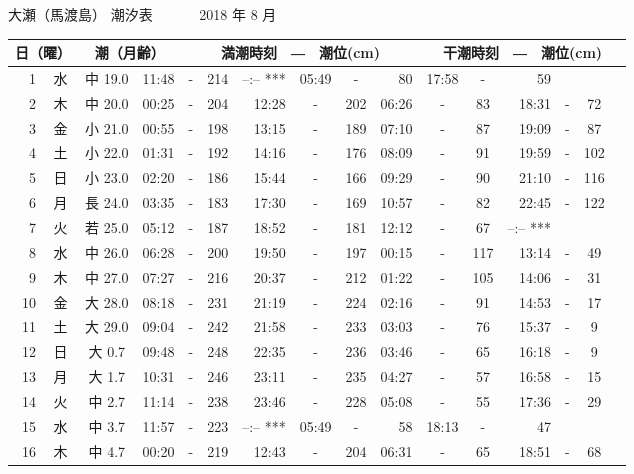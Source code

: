\documentclass[12pt.a4j]{jsarticle}
\begin{document}
\begin{center}
\begin{table}[ht]
\begin{tabular}{|rc|cr|ccrccr|ccrccr|}
\hline
\end{tabular}
\end{table}
\newpage
 {\LARGE 大瀬（馬渡島）  潮汐表　　　}
 {\large 2018 年  8 月}\\
 \begin{table}[ht]
 \begin{tabular}{|rc|cr|ccrccr|ccrccr|}
 \hline
 \multicolumn{2}{|c|}{日（曜）} & \multicolumn{2}{c|}{潮（月齢）} & \multicolumn{6}{c|}{満潮時刻　―　潮位(cm)} & \multicolumn{6}{c|}{干潮時刻　―　潮位(cm)} \\
 \hline
 1 & 水 & 中 19.0 & 11:48 &-& 214 & --:--   *** & 05:49 &-&  80 & 17:58 &-&  59 \\
\hline
 2 & 木 & 中 20.0 & 00:25 &-& 204 & 12:28 &-& 202 & 06:26 &-&  83 & 18:31 &-&  72 \\
\hline
 3 & 金 & 小 21.0 & 00:55 &-& 198 & 13:15 &-& 189 & 07:10 &-&  87 & 19:09 &-&  87 \\
\hline
 4 & 土 & 小 22.0 & 01:31 &-& 192 & 14:16 &-& 176 & 08:09 &-&  91 & 19:59 &-& 102 \\
\hline
 5 & 日 & 小 23.0 & 02:20 &-& 186 & 15:44 &-& 166 & 09:29 &-&  90 & 21:10 &-& 116 \\
\hline
 6 & 月 & 長 24.0 & 03:35 &-& 183 & 17:30 &-& 169 & 10:57 &-&  82 & 22:45 &-& 122 \\
\hline
 7 & 火 & 若 25.0 & 05:12 &-& 187 & 18:52 &-& 181 & 12:12 &-&  67 & --:--   *** \\
\hline
 8 & 水 & 中 26.0 & 06:28 &-& 200 & 19:50 &-& 197 & 00:15 &-& 117 & 13:14 &-&  49 \\
\hline
 9 & 木 & 中 27.0 & 07:27 &-& 216 & 20:37 &-& 212 & 01:22 &-& 105 & 14:06 &-&  31 \\
\hline
10 & 金 & 大 28.0 & 08:18 &-& 231 & 21:19 &-& 224 & 02:16 &-&  91 & 14:53 &-&  17 \\
\hline
11 & 土 & 大 29.0 & 09:04 &-& 242 & 21:58 &-& 233 & 03:03 &-&  76 & 15:37 &-&   9 \\
\hline
12 & 日 & 大  0.7 & 09:48 &-& 248 & 22:35 &-& 236 & 03:46 &-&  65 & 16:18 &-&   9 \\
\hline
13 & 月 & 大  1.7 & 10:31 &-& 246 & 23:11 &-& 235 & 04:27 &-&  57 & 16:58 &-&  15 \\
\hline
14 & 火 & 中  2.7 & 11:14 &-& 238 & 23:46 &-& 228 & 05:08 &-&  55 & 17:36 &-&  29 \\
\hline
15 & 水 & 中  3.7 & 11:57 &-& 223 & --:--   *** & 05:49 &-&  58 & 18:13 &-&  47 \\
\hline
16 & 木 & 中  4.7 & 00:20 &-& 219 & 12:43 &-& 204 & 06:31 &-&  65 & 18:51 &-&  68 \\

\end{tabular}
\end{table}
\end{center}
\end{document}
